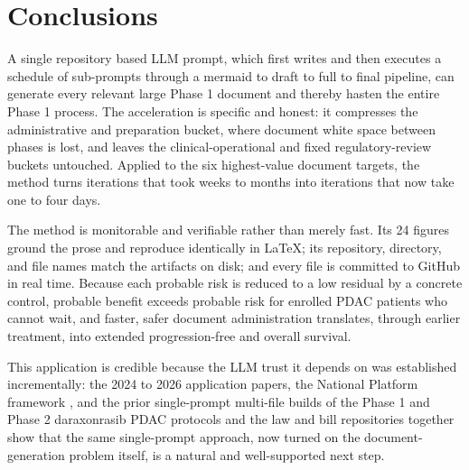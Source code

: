 \section{Conclusions}

A single repository based LLM prompt, which first writes and then executes a schedule
of sub-prompts through a mermaid to draft to full to final pipeline, can generate
every relevant large Phase 1 document and thereby hasten the entire Phase 1 process.
The acceleration is specific and honest: it compresses the administrative and
preparation bucket, where document white space between phases is lost, and leaves the
clinical-operational and fixed regulatory-review buckets untouched. Applied to the
six highest-value document targets, the method turns iterations that took weeks to
months into iterations that now take one to four days.

The method is monitorable and verifiable rather than merely fast. Its 24 figures
ground the prose and reproduce identically in LaTeX; its repository, directory, and
file names match the artifacts on disk; and every file is committed to GitHub in real
time. Because each probable risk is reduced to a low residual by a concrete control,
probable benefit exceeds probable risk for enrolled PDAC patients who cannot wait,
and faster, safer document administration translates, through earlier treatment, into
extended progression-free and overall survival.

This application is credible because the LLM trust it depends on was established
incrementally: the 2024 to 2026 application papers, the National Platform framework
\cite{natplatform}, and the prior single-prompt multi-file builds of the Phase 1 and
Phase 2 daraxonrasib PDAC protocols and the law and bill repositories
\cite{phase1protocol, phase2protocol, kawchak_2026_20196639, lawnarrative,
adoptionguide, lawenactment, hr9510v5, bill01v4} together show that the same
single-prompt approach, now turned on the document-generation problem itself, is a
natural and well-supported next step.  
